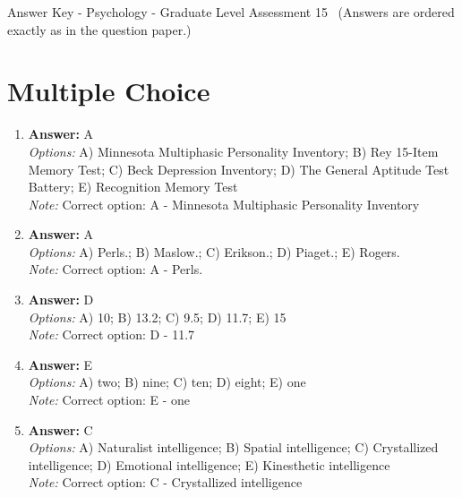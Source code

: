 \documentclass[12pt]{article}
\begin{document}
\begin{center}
Answer Key - Psychology - Graduate Level Assessment 15 \
\small (Answers are ordered exactly as in the question paper.)
\end{center}

\section*{Multiple Choice}
\begin{enumerate}[label=\arabic*.]
\item \textbf{Answer:} A
\\ \textit{Options:} A) Minnesota Multiphasic Personality Inventory; B) Rey 15-Item Memory Test; C) Beck Depression Inventory; D) The General Aptitude Test Battery; E) Recognition Memory Test
\\ \textit{Note:} Correct option: A - Minnesota Multiphasic Personality Inventory
\item \textbf{Answer:} A
\\ \textit{Options:} A) Perls.; B) Maslow.; C) Erikson.; D) Piaget.; E) Rogers.
\\ \textit{Note:} Correct option: A - Perls.
\item \textbf{Answer:} D
\\ \textit{Options:} A) 10; B) 13.2; C) 9.5; D) 11.7; E) 15
\\ \textit{Note:} Correct option: D - 11.7
\item \textbf{Answer:} E
\\ \textit{Options:} A) two; B) nine; C) ten; D) eight; E) one
\\ \textit{Note:} Correct option: E - one
\item \textbf{Answer:} C
\\ \textit{Options:} A) Naturalist intelligence; B) Spatial intelligence; C) Crystallized intelligence; D) Emotional intelligence; E) Kinesthetic intelligence
\\ \textit{Note:} Correct option: C - Crystallized intelligence
\end{enumerate}
\end{document}
